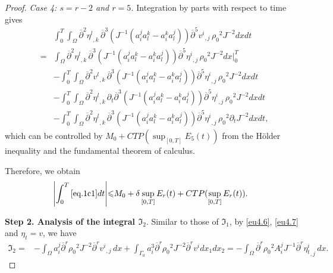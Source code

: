\documentclass[12pt,twoside,reqno]{amsart}
\numberwithin{equation}{section}
\theoremstyle{definition}
\theoremstyle{remark}
\begin{document}
\begin{proof}
\emph{Case 4: $s=r-2$ and $r=5$.} Integration by parts with respect to time gives
\begin{align*}
  &{\int_0^T\!\!\!\!\int_\Omega } {\overline{\partial}}^{2}{{{\eta^l}}_{,{k}}\,}{\overline{\partial}}^{3}\left(J^{-1}(a^j_ia^k_l-a^k_ia^j_l)\right){{{{\overline{\partial}}^5 v^i}}_{,{j}}\,}{\rho_0}^2  J^{-2}dxdt\\
  =&\int_\Omega {\overline{\partial}}^{2}{{{\eta^l}}_{,{k}}\,}{\overline{\partial}}^{3}\left(J^{-1}(a^j_ia^k_l-a^k_ia^j_l)\right){{{{\overline{\partial}}^5 \eta^i}}_{,{j}}\,}{\rho_0}^2  J^{-2}dx\Big|_0^T\\
  &-{\int_0^T\!\!\!\!\int_\Omega } {\overline{\partial}}^{2}{{{v^l}}_{,{k}}\,}{\overline{\partial}}^{3}\left(J^{-1}(a^j_ia^k_l-a^k_ia^j_l)\right){{{{\overline{\partial}}^5 \eta^i}}_{,{j}}\,}{\rho_0}^2  J^{-2}dxdt\\
  &-{\int_0^T\!\!\!\!\int_\Omega } {\overline{\partial}}^{2}{{{\eta^l}}_{,{k}}\,}{\partial}_t{\overline{\partial}}^{3}\left(J^{-1}(a^j_ia^k_l-a^k_ia^j_l)\right){{{{\overline{\partial}}^5 \eta^i}}_{,{j}}\,}{\rho_0}^2  J^{-2}dxdt\\
  &-{\int_0^T\!\!\!\!\int_\Omega } {\overline{\partial}}^{2}{{{\eta^l}}_{,{k}}\,}{\overline{\partial}}^{3}\left(J^{-1}(a^j_ia^k_l-a^k_ia^j_l)\right){{{{\overline{\partial}}^5 \eta^i}}_{,{j}}\,}{\rho_0}^2  {\partial}_t J^{-2}dxdt,
\end{align*}
which can be controlled by $M_0+CTP(\sup_{[0,T]}E_5(t))$ from the H\"older inequality and the fundamental theorem of calculus.

Therefore, we obtain
\begin{align*}
  {\left\vert{\int_0^T\eqref{eq.1c1}dt}\right\vert}{\leqslant} &M_0+\delta\sup_{[0,T]}E_r(t)+CTP(\sup_{[0,T]}E_r(t)).
\end{align*}

\textbf{Step 2. Analysis of the integral ${\mathfrak{I}}_2$}.
Similar to those of ${\mathfrak{I}}_1$, by \eqref{eu4.6}, \eqref{eu4.7} and $\eta_t=v$, we have
\begin{align*}
  {\mathfrak{I}}_2=&-\int_\Omega a^j_i{\overline{\partial}}^r{\rho_0}^2  J^{-2}{{{{\overline{\partial}}^r v^i}}_{,{j}}\,}dx +\int_{\Gamma_0}a^3_i{\overline{\partial}}^r{\rho_0}^2  J^{-2}{\overline{\partial}}^r v^idx_1dx_2
  =-\int_\Omega {\overline{\partial}}^r{\rho_0}^2  A^j_i J^{-1}{{{{\overline{\partial}}^r \eta_t^i}}_{,{j}}\,}dx.
\end{align*}


\end{proof}
\end{document}
